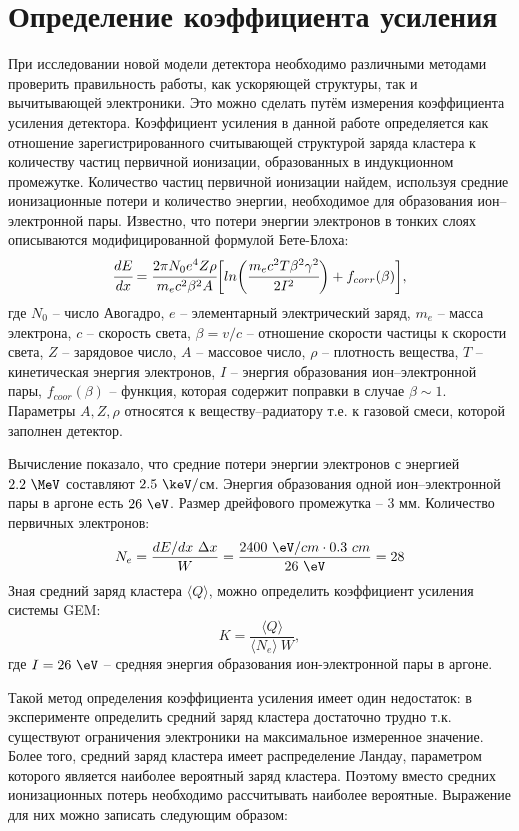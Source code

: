 \section{Определение коэффициента усиления}
\label{sec:ampl_c}
При исследовании новой модели детектора необходимо различными методами проверить правильность работы, как ускоряющей структуры, так и вычитывающей электроники. Это можно сделать путём измерения коэффициента усиления детектора. 
Коэффициент усиления в данной работе определяется как отношение зарегистрированного считывающей структурой заряда кластера к количеству частиц первичной ионизации, образованных в индукционном промежутке. 
Количество частиц первичной ионизации найдем, используя средние ионизационные потери и количество энергии, необходимое для образования ион--электронной пары. Известно, что потери энергии электронов в тонких слоях описываются модифицированной формулой Бете-Блоха:
\begin{equation}
\cfrac{dE}{dx} = \cfrac{2\pi N_0 e^4 Z\rho}{m_e c^2 \beta^2 A}\biggl[ln \bigg(\cfrac{ m_ec^2T\beta^2\gamma^2}{2I^2}\bigg) + f_{corr}(\beta)\biggr],
\label{eq:Bethe_Bloch}
\end{equation}
где $N_0$ -- число Авогадро, $e$ -- элементарный электрический заряд, $m_e$ -- масса электрона, $c$ -- скорость света, $\beta = v/c$ -- отношение скорости частицы к скорости света, $Z$ -- зарядовое число, $A$ -- массовое число, $\rho$ -- плотность вещества, $T$ -- кинетическая энергия электронов, $I$ -- энергия образования ион--электронной пары, $f_{coor}(\beta)$ -- функция, которая содержит поправки в случае $\beta \sim 1$. Параметры $A,Z,\rho$ относятся к веществу--радиатору т.е. к газовой смеси, которой заполнен детектор.
\par Вычисление показало, что средние потери энергии электронов с энергией $2.2~\MeV$ составляют $2.5~\keV/$см. Энергия образования одной ион--электронной пары в аргоне есть $26~\eV$. Размер дрейфового промежутка -- 3 мм. Количество первичных электронов:
\begin{equation}
	N_e = \frac{dE/dx~\Delta x}{W} =\frac {2400~\eV/cm \cdot 0.3~cm}{26~\eV} = 28
\end{equation}
Зная средний заряд кластера $\langle Q\rangle$, можно определить коэффициент усиления системы GEM: 
\begin{equation}
K = \frac{\langle Q\rangle}{\langle N_e \rangle\ W},
\label{eq:ampl_k}
\end{equation}
где $I = 26~\eV$ -- средняя энергия образования ион-электронной пары в аргоне. 
\par Такой метод определения коэффициента усиления имеет один недостаток: в эксперименте определить средний заряд кластера достаточно трудно т.к. существуют ограничения электроники на максимальное измеренное значение. Более того, средний заряд кластера имеет распределение Ландау, параметром которого является наиболее вероятный заряд кластера. Поэтому вместо средних ионизационных потерь необходимо рассчитывать наиболее вероятные. Выражение для них можно записать следующим образом:
